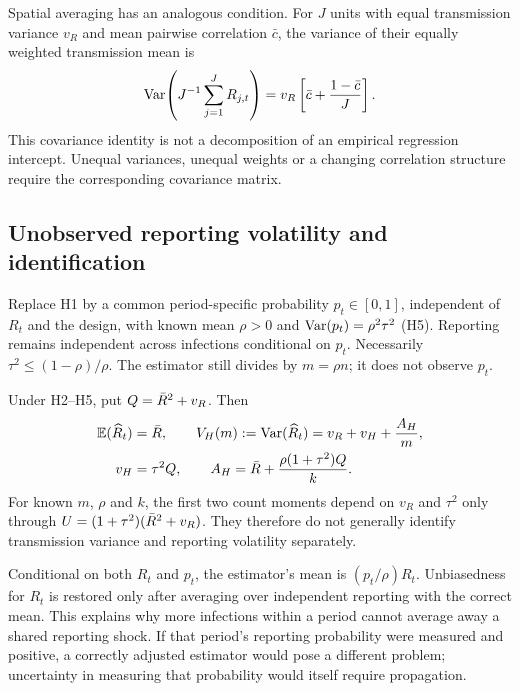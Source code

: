 Spatial averaging has an analogous condition. For $J$ units with equal transmission variance $v_R$ and mean pairwise correlation $\bar c$, the variance of their equally weighted transmission mean is
\begin{equation}
  \mathrm{Var}\!\left(J^{-1}\sum_{j=1}^J R_{j,t}\right)
  =v_R\left[\bar c+\frac{1-\bar c}{J}\right].
  \label{eq:pooling}
\end{equation}
This covariance identity is not a decomposition of an empirical regression intercept. Unequal variances, unequal weights or a changing correlation structure require the corresponding covariance matrix.

\subsection{Unobserved reporting volatility and identification}
\label{sec:bg-reporting}

Replace H1 by a common period-specific probability $p_t\in[0,1]$, independent of $R_t$ and the design, with known mean $\rho>0$ and $\mathrm{Var}(p_t)=\rho^2\tau^2$ (H5). Reporting remains independent across infections conditional on $p_t$. Necessarily $\tau^2\le(1-\rho)/\rho$. The estimator still divides by $m=\rho n$; it does not observe $p_t$.

\begin{proposition}
\label{prop:report-noise}
Under H2--H5, put $Q=\bar R^2+v_R$. Then
\begin{equation}
\begin{aligned}
  \mathbb{E}(\widehat R_t)&=\bar R,\qquad
  V_H(m):=\mathrm{Var}(\widehat R_t)=v_R+v_H+\frac{A_H}{m},\\
  v_H&=\tau^2Q,\qquad
  A_H=\bar R+\frac{\rho(1+\tau^2)Q}{k}.
\end{aligned}
  \label{eq:vH-AH}
\end{equation}
For known $m$, $\rho$ and $k$, the first two count moments depend on $v_R$ and $\tau^2$ only through $U=(1+\tau^2)(\bar R^2+v_R)$. They therefore do not generally identify transmission variance and reporting volatility separately.
\end{proposition}

Conditional on both $R_t$ and $p_t$, the estimator's mean is $(p_t/\rho)R_t$. Unbiasedness for $R_t$ is restored only after averaging over independent reporting with the correct mean. This explains why more infections within a period cannot average away a shared reporting shock. If that period's reporting probability were measured and positive, a correctly adjusted estimator would pose a different problem; uncertainty in measuring that probability would itself require propagation.

